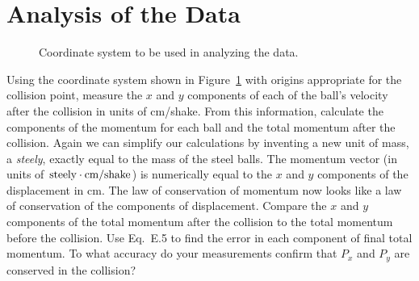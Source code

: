 \section*{Analysis of the Data}
\begin{figure}
\begin{center}
{}
\end{center}
\caption{Coordinate system to be used in analyzing the data.  \label{fig:tb2}}
\end{figure}
     Using the coordinate system shown in Figure~\ref{fig:tb2} with origins
appropriate for the collision point, measure the $x$ and $y$ components
of each of the ball's velocity after the collision in units of cm/shake.  From
this information, calculate the components of the momentum for each ball
and the total momentum after the collision.  Again we can simplify
our calculations by inventing a new unit of mass, a {\em steely}, exactly
equal to the mass of the steel balls.  The
momentum vector (in units of ${\rm steely\cdot cm/shake}$) is
numerically equal to the $x$ and $y$ components of the displacement in cm.
The law of conservation of momentum now looks like a law of
conservation of the components of displacement.
Compare the $x$ and $y$ components of the total momentum
after the collision to the total momentum before the collision.  
Use Eq.~E.5 to find the error in each component of final total momentum. To what
accuracy do your measurements confirm that $P_{x}$ and $P_{y}$ are conserved
in the collision?

